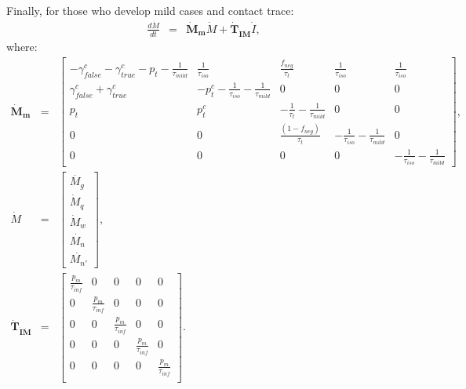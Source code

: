 \documentclass[notitlepage, superscriptaddress]{revtex4-2}
\begin{document}
Finally, for those who develop mild cases and contact trace:
\begin{eqnarray}
\frac{d\dot{M}}{dt} &=& \boldsymbol{\dot{M}_{m}}  \dot{M} + \boldsymbol{\dot{T}_{\dot{I}\dot{M}}}  \dot{I}, 
\end{eqnarray}
where:
%
\begin{eqnarray}
\boldsymbol{\dot{M}_{m}} &=&
\begin{bmatrix}
 -\gamma^{c}_{false} -\gamma^{c}_{true} - p_{t} -\frac{1}{\tau_{mild}} & \frac{1}{\tau_{iso}}  & \frac{f_{neg}}{\tau_{t}} & \frac{1}{\tau_{iso}} & \frac{1}{\tau_{iso}} \\
\gamma^{c}_{false} + \gamma^{c}_{true}    &  -p^{c}_{t}  - \frac{1}{\tau_{iso}} - \frac{1}{\tau_{mild}}      &  0    & 0  & 0\\
p_{t}     &  p^{c}_{t}                  &  -\frac{1}{\tau_{t}}  - \frac{1}{\tau_{mild}}  & 0 & 0\\
0 & 0 & \frac{(1-f_{neg})}{\tau_{t}}  & -\frac{1}{\tau_{iso}}  -  \frac{1}{\tau_{mild}} & 0 \\ 
0 & 0 & 0 & 0 & -\frac{1}{\tau_{iso}}  -  \frac{1}{\tau_{mild}}
\end{bmatrix}, \\ 
%
\dot{M} &=& 
\begin{bmatrix}
\dot{M_{g}} \\ \dot{M}_{q} \\ \dot{M}_{w}\\ \dot{M_{n}} \\ \dot{M_{n'}}
\end{bmatrix}, \\ 
%
\boldsymbol{\dot{T}_{\dot{I}\dot{M}}} &=&
\begin{bmatrix}
\frac{p_{m}}{\tau_{inf}}  & 0                 & 0 & 0 & 0\\ 
 0          &  \frac{p_{m}}{\tau_{inf}}  & 0 & 0 & 0 \\ 
 0          & 0                 &  \frac{p_{m}}{\tau_{inf}} & 0 & 0 \\ 
0           & 0                 &  0 & \frac{p_{m}}{\tau_{inf}} & 0 \\ 
0           & 0                 &  0 & 0 & \frac{p_{m}}{\tau_{inf}} \\
\end{bmatrix}.
%
\end{eqnarray}
\end{document}
